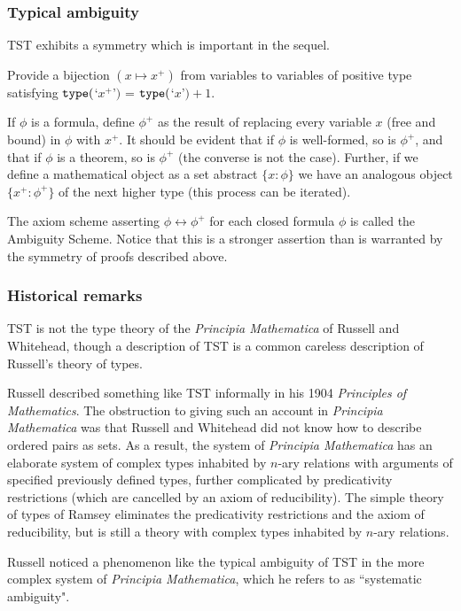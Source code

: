 \documentclass[12pt]{article}
\begin{document}
\subsubsection{Typical ambiguity}

TST exhibits a symmetry which is important in the sequel.

Provide a bijection $(x \mapsto x^+)$ from variables to variables of positive type satisfying   ${\tt type}($`$x^+$'$)$ = ${\tt type}($`$x$'$)+1$.

If $\phi$ is a formula, define $\phi^+$ as the result of replacing every variable $x$ (free and bound) in $\phi$ with $x^+$.  It should be evident that if $\phi$ is well-formed, so is $\phi^+$,
and that if $\phi$ is a theorem, so is $\phi^+$ (the converse is not the case).  Further, if we define a mathematical object as a set abstract $\{x:\phi\}$ we have an analogous
object $\{x^+:\phi^+\}$ of the next higher type (this process can be iterated).

The axiom scheme asserting $\phi \leftrightarrow \phi^+$ for each closed formula $\phi$ is called the Ambiguity Scheme.   Notice that this is a stronger assertion than is warranted by the symmetry of proofs described above.

\subsubsection{Historical remarks}

TST is not the type theory of the {\em Principia Mathematica\/} of Russell and Whitehead, though a description of TST is a common careless description of Russell's theory of types.

Russell described something like TST informally in his 1904 {\em Principles of Mathematics\/}.  The obstruction to giving such an account in {\em Principia Mathematica\/} was that
Russell and Whitehead did not know how to describe ordered pairs as sets.  As a result, the system of {\em Principia Mathematica\/} has an elaborate system of  complex
types inhabited by $n$-ary relations with arguments of specified previously defined types, further complicated by predicativity restrictions (which are cancelled by an axiom of reducibility).
The simple theory of types of Ramsey eliminates the predicativity restrictions and the axiom of reducibility, but is still a theory with complex types inhabited by $n$-ary relations.

Russell noticed a phenomenon like the typical ambiguity of TST in the more complex system of {\em Principia Mathematica\/}, which he refers to as ``systematic ambiguity".
\end{document}
